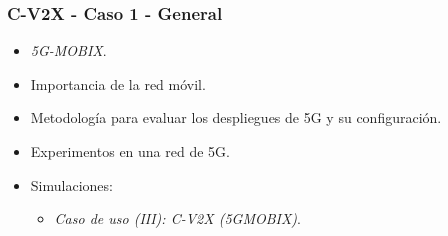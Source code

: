 \documentclass{beamer}
\begin{document}
\begin{frame}
\frametitle{C-V2X - Caso 1 - General}

\begin{itemize}
\item \textit{5G-MOBIX}.
\item Importancia de la red móvil.
\item Metodología para evaluar los despliegues de 5G y su configuración.
\item Experimentos en una red de 5G.
\item {
	Simulaciones:
	\begin{itemize}
	\item \textit{Caso de uso (III): C-V2X (5GMOBIX)}.
	\end{itemize}
}
\end{itemize}
\end{frame}
\end{document}
